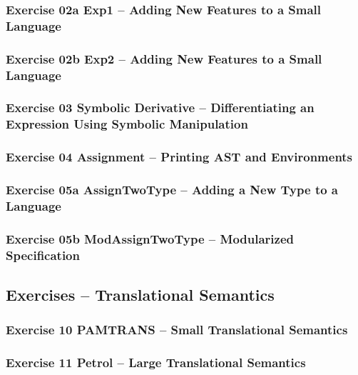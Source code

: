 \documentclass[10.5pt,a4]{article}
\begin{document}
\subsubsection{Exercise 02a Exp1 –  Adding New Features to a Small Language}



\subsubsection{Exercise 02b Exp2 –  Adding New Features to a Small Language}



\subsubsection{Exercise 03 Symbolic Derivative –  Differentiating an Expression Using Symbolic Manipulation}



\subsubsection{Exercise 04 Assignment – Printing AST and Environments}



\subsubsection{Exercise 05a AssignTwoType – Adding a New Type to a Language}



\subsubsection{Exercise 05b ModAssignTwoType – Modularized Specification}


\subsection{Exercises – Translational Semantics}
\subsubsection{Exercise 10 PAMTRANS – Small Translational Semantics}


\subsubsection{Exercise 11 Petrol – Large Translational Semantics}

\end{document}
